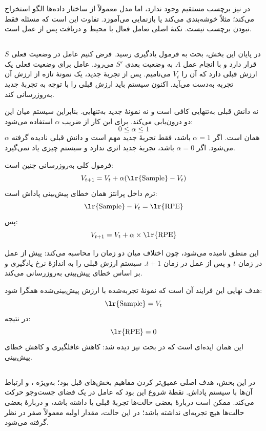 در  نیز برچسب مستقیم وجود ندارد، اما مدل معمولاً از ساختار داده‌ها الگو استخراج می‌کند؛ مثلاً خوشه‌بندی می‌کند یا بازنمایی می‌آموزد. تفاوت  این است که مسئله فقط نبودن برچسب نیست. نکتهٔ اصلی تعامل فعال با محیط و دریافت  پس از عمل است.

\subsection{}
در پایان این بخش، بحث به فرمول یادگیری رسید. فرض کنیم عامل در وضعیت فعلی \(S\) قرار دارد و با انجام عمل \(A\) به وضعیت بعدی \(S'\) می‌رود. عامل برای وضعیت فعلی یک ارزش قبلی دارد که آن را \(V_t\) می‌نامیم. پس از تجربهٔ جدید، یک نمونهٔ تازه از ارزش آن تجربه به‌دست می‌آید. اکنون سیستم باید ارزش قبلی را با توجه به تجربهٔ جدید به‌روزرسانی کند.

نه دانش قبلی به‌تنهایی کافی است و نه نمونهٔ جدید به‌تنهایی. بنابراین سیستم میان این دو درون‌یابی می‌کند. برای این کار از ضریب \(\alpha\) استفاده می‌شود:
\[
0 \leq \alpha \leq 1
\]
\(\alpha\) همان  است. اگر \(\alpha = 1\) باشد، فقط تجربهٔ جدید مهم است و دانش قبلی نادیده گرفته می‌شود. اگر \(\alpha = 0\) باشد، تجربهٔ جدید اثری ندارد و سیستم چیزی یاد نمی‌گیرد.

فرمول کلی به‌روزرسانی چنین است:
\[
V_{t+1} = V_t + \alpha(\text{\lr{Sample}} - V_t)
\]
ترم داخل پرانتز همان خطای پیش‌بینی پاداش است:
\[
\text{\lr{Sample}} - V_t = \text{\lr{RPE}}
\]
پس:
\[
V_{t+1} = V_t + \alpha \times \text{\lr{RPE}}
\]

این منطق  نامیده می‌شود، چون اختلاف میان دو زمان را محاسبه می‌کند: پیش از عمل در زمان \(t\) و پس از عمل در زمان \(t+1\). سیستم ارزش قبلی را به اندازهٔ نرخ یادگیری و بر اساس خطای پیش‌بینی به‌روزرسانی می‌کند.

هدف نهایی این فرایند آن است که نمونهٔ تجربه‌شده با ارزش پیش‌بینی‌شده همگرا شود:
\[
\text{\lr{Sample}} = V_t
\]
در نتیجه:
\[
\text{\lr{RPE}} = 0
\]
این همان ایده‌ای است که در بحث  نیز دیده شد: کاهش غافلگیری و کاهش خطای پیش‌بینی.

\subsection{}
در این بخش، هدف اصلی عمیق‌تر کردن مفاهیم بخش‌های قبل بود؛ به‌ویژه ،  و ارتباط آن‌ها با سیستم پاداش. نقطهٔ شروع این بود که عامل در یک فضای جست‌وجو حرکت می‌کند. ممکن است دربارهٔ بعضی حالت‌ها تجربهٔ قبلی یا  داشته باشد، و دربارهٔ بعضی حالت‌ها هیچ تجربه‌ای نداشته باشد؛ در این حالت، مقدار اولیه معمولاً صفر در نظر گرفته می‌شود.

